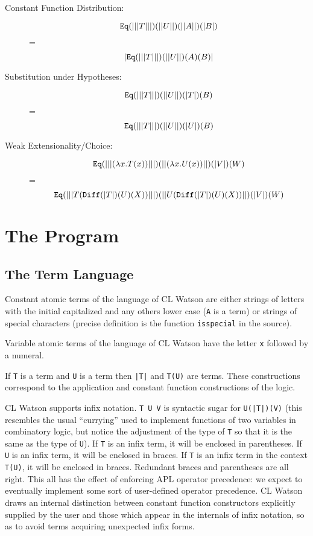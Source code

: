 \documentclass[12pt]{article}
\begin{document}
\begin{description}
\begin{description}
\item[Constant Function Distribution:] $${\tt Eq}(|||T|||)(||U||)(||A||)(|B|)$$ =
$$|{\tt Eq}(|||T|||)(||U||)(A)(B)|$$

\item[Substitution under Hypotheses:]  $${\tt Eq}(|||T|||)(||U||)(|T|)(B)$$=
$${\tt Eq}(|||T|||)(||U||)(|U|)(B)$$

\item[Weak Extensionality/Choice:] $${\tt Eq}(|||(\lambda x.T(x))|||)(||(\lambda x.U(x))||)(|V|)(W)$$=
$${\tt Eq}(|||T({\tt Diff}(|T|)(U)(X))|||)(||U({\tt Diff}(|T|)(U)(X))||)(|V|)(W)$$

\end{description}

\end{description} 

\section{The Program}

\subsection{The Term Language}

Constant atomic terms of the language of CL Watson are either strings
of letters with the initial capitalized and any others lower case
({\tt A} is a term) or strings of special characters (precise definition is
the function {\tt isspecial} in the source).

Variable atomic terms of the language of CL Watson have the letter {\tt x}
followed by a numeral.

If {\tt T} is a term and {\tt U} is a term then {\tt |T|} and {\tt T(U)}
are terms.  These constructions correspond to the application and constant
function constructions of the logic.

CL Watson supports infix notation.  {\tt T U V} is syntactic sugar for
{\tt U(|T|)(V)} (this resembles the usual ``currying'' used to
implement functions of two variables in combinatory logic, but notice
the adjustment of the type of {\tt T} so that it is the same as the
type of {\tt U}).  If {\tt T} is an infix term, it will be enclosed in
parentheses.  If {\tt U} is an infix term, it will be enclosed in
braces.  If {\tt T} is an infix term in the context {\tt T(U)}, it
will be enclosed in braces.  Redundant braces and parentheses are all
right.  This all has the effect of enforcing APL operator precedence:
we expect to eventually implement some sort of user-defined operator
precedence.  CL Watson draws an internal distinction between constant
function constructors explicitly supplied by the user and those which
appear in the internals of infix notation, so as to avoid terms
acquiring unexpected infix forms.
\end{document}
